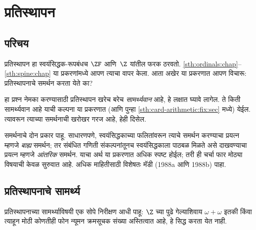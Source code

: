 \chapter{प्रतिस्थापन}\label{sth:replacement:chap}




\section{परिचय}\label{sth:replacement:intro:sec}

प्रतिस्थापन हा स्वयंसिद्धक-रूपबंधच $\ZF$ आणि~$\Z$ यांतील फरक ठरवतो. \ref{sth:ordinals:chap}--\ref{sth:spine:chap} या प्रकरणांमध्ये आपण त्याचा वापर केला. आता अखेर या प्रकरणात आपण विचारू: प्रतिस्थापनाचे समर्थन करता येते का?

हा प्रश्न नेमका करण्यासाठी प्रतिस्थापन खरेच बरेच \emph{सामर्थ्यवान} आहे, हे लक्षात घ्यावे लागेल. ते किती सामर्थ्यवान आहे याची कल्पना या प्रकरणात (आणि पुन्हा \ref{sth:card-arithmetic:fix:sec} मध्ये) येईल. त्यावरून त्याच्या समर्थनाची खरोखर गरज आहे, हेही दिसेल.

समर्थनाचे दोन प्रकार पाहू. साधारणपणे, स्वयंसिद्धकाच्या फलितांवरून त्याचे समर्थन करण्याचा प्रयत्न म्हणजे \emph{बाह्य} समर्थन; तर संबंधित गणिती संकल्पनांतूनच स्वयंसिद्धकाला पाठबळ मिळते असे दाखवण्याचा प्रयत्न म्हणजे \emph{आंतरिक} समर्थन. याचा अर्थ या प्रकरणात अधिक स्पष्ट होईल; तरी ही चर्चा फार मोठ्या विषयाची केवळ सुरुवात आहे. अधिक माहितीसाठी विशेषतः मॅडी (1988a आणि 1988b) पाहा.







\section{प्रतिस्थापनाचे सामर्थ्य}\label{sth:replacement:strength:sec}

प्रतिस्थापनाच्या सामर्थ्याविषयी एक सोपे निरीक्षण आधी पाहू: $\Z$ च्या पुढे गेल्याशिवाय $\omega + \omega$ इतकी किंवा त्याहून मोठी कोणतीही फोन न्यूमन क्रमसूचक संख्या अस्तित्वात आहे, हे सिद्ध करता येत नाही.

